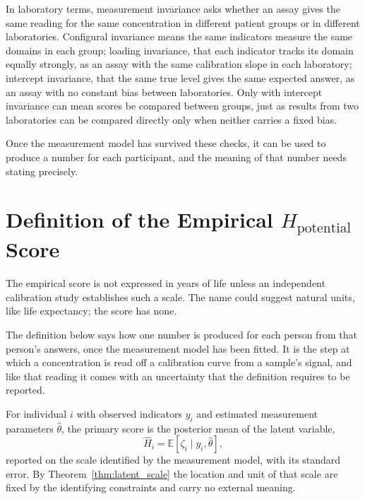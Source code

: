 In laboratory terms, measurement invariance asks whether an assay gives the same reading for the same concentration in different patient groups or in different laboratories. Configural invariance means the same indicators measure the same domains in each group; loading invariance, that each indicator tracks its domain equally strongly, as an assay with the same calibration slope in each laboratory; intercept invariance, that the same true level gives the same expected answer, as an assay with no constant bias between laboratories. Only with intercept invariance can mean scores be compared between groups, just as results from two laboratories can be compared directly only when neither carries a fixed bias.

Once the measurement model has survived these checks, it can be used to produce a number for each participant, and the meaning of that number needs stating precisely.

\section{Definition of the Empirical $H_{\text{potential}}$ Score}
\label{sec:scoredef}

The empirical score is not expressed in years of life unless an independent calibration study establishes such a scale. The name could suggest natural units, like life expectancy; the score has none.

The definition below says how one number is produced for each person from that person's answers, once the measurement model has been fitted. It is the step at which a concentration is read off a calibration curve from a sample's signal, and like that reading it comes with an uncertainty that the definition requires to be reported.

\begin{definition}
\label{def:factorscore}
For individual $i$ with observed indicators $y_i$ and estimated measurement
parameters $\widehat\theta$, the primary score is the posterior mean of the
latent variable,
\begin{equation}
    \widehat H_i = \mathbb{E}[\zeta_i\mid y_i,\widehat\theta],
    \label{eq:factorscore}
\end{equation}
reported on the scale identified by the measurement model, with its standard
error. By Theorem~\ref{thm:latent_scale} the location and unit of that scale
are fixed by the identifying constraints and carry no external meaning.
\end{definition}


